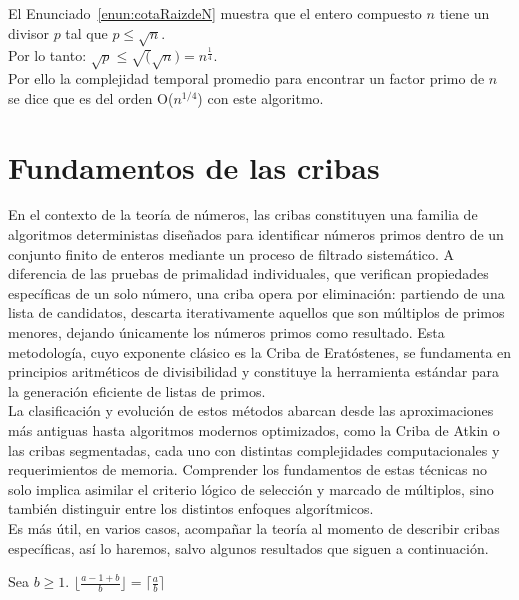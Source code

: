 El Enunciado~\ref{enun:cotaRaizdeN} muestra que el entero compuesto $n$ tiene un divisor $p$ tal que $p \leq \sqrt{n}$. \\
Por lo tanto: $\sqrt{p} \leq \sqrt (\sqrt{n})=n^{\frac{1}{4}}$. \\
Por ello la complejidad temporal promedio para encontrar un factor primo de $n$ se dice que es del orden O($n^{1/4}$) con este algoritmo.

\section{Fundamentos de las cribas}
En el contexto de la teoría de números, las cribas constituyen una familia de algoritmos deterministas diseñados para identificar números primos dentro de un conjunto finito de enteros mediante un proceso de filtrado sistemático. A diferencia de las pruebas de primalidad individuales, que verifican propiedades específicas de un solo número, una criba opera por eliminación: partiendo de una lista de candidatos, descarta iterativamente aquellos que son múltiplos de primos menores, dejando únicamente los números primos como resultado. Esta metodología, cuyo exponente clásico es la Criba de Eratóstenes, se fundamenta en principios aritméticos de divisibilidad y constituye la herramienta estándar para la generación eficiente de listas de primos.\\
La clasificación y evolución de estos métodos abarcan desde las aproximaciones más antiguas hasta algoritmos modernos optimizados, como la Criba de Atkin o las cribas segmentadas, cada uno con distintas complejidades computacionales y requerimientos de memoria. Comprender los fundamentos de estas técnicas no solo implica asimilar el criterio lógico de selección y marcado de múltiplos, sino también distinguir entre los distintos enfoques algorítmicos.\\
Es más útil, en varios casos, acompañar la teoría al momento de describir cribas específicas, así lo haremos, salvo algunos resultados que siguen a continuación.

\begin{enunciado}\label{enun:ceilequivalentefloor}\leavevmode\par
Sea $b \geq 1$. $\lfloor \frac{a-1+b}{b} \rfloor  = \lceil \frac{a}{b}\rceil$
\end{enunciado}

